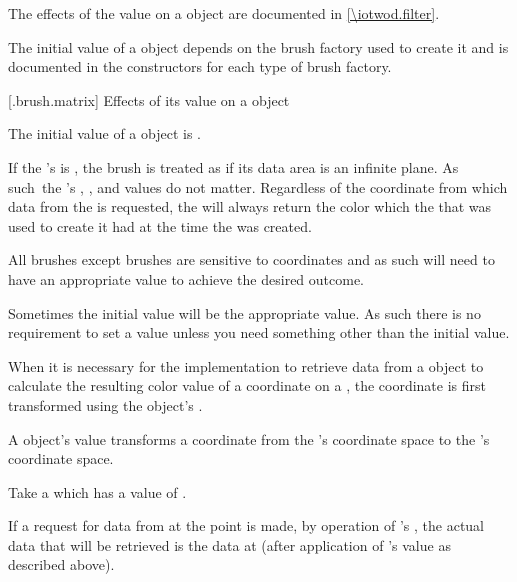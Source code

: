 \pnum
The effects of the  value on a  object are documented in \ref{\iotwod.filter}.

\pnum
The initial  value of a  object depends on the brush factory used to create it and is documented in the  constructors for each type of brush factory.

 [\iotwod.brush.matrix] {Effects of its  value on a  object}

\pnum
The initial  value of a  object is .

\pnum
If the 's  is , the brush is treated as if its data area is an infinite plane. As such\ the 's , , and  values do not matter. Regardless of the coordinate from which data from the  is requested, the  will always return the color which the  that was used to create it had at the time the  was created.

\pnum
All brushes except  brushes are sensitive to coordinates and as such will need to have an appropriate  value to achieve the desired outcome.

\pnum
\enternote
Sometimes the initial  value will be the appropriate value. As such there is no requirement to set a  value unless you need something other than the initial value.
\exitnote

\pnum
When it is necessary for the implementation to retrieve data from a  object to calculate the resulting color value of a coordinate on a , the coordinate is first transformed using the  object's .

\pnum
A  object's  value transforms a coordinate from the 's coordinate space to the 's coordinate space.

\pnum
\enterexample
Take a  which has a  value of .

\pnum
If a request for data from  at the point  is made, by operation of 's , the actual data that will be retrieved is the data at  (after application of 's  value as described above).

